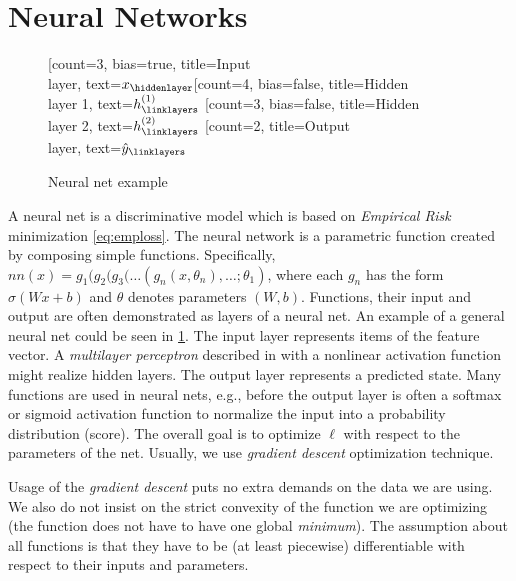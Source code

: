 \section{Neural Networks}
\begin{figure}
    \centering
    \begin{neuralnetwork}[height=4]
        \newcommand{\x}[2]{$x_#2$}
        \newcommand{\y}[2]{$\hat{y}_#2$}
        \newcommand{\hfirst}[2]{\small $h^{(1)}_#2$}
        \newcommand{\hsecond}[2]{\small $h^{(2)}_#2$}
        [count=3, bias=true, title=Input\\layer, text=\x]
        \hiddenlayer[count=4, bias=false, title=Hidden\\layer 1, text=\hfirst] \linklayers
        \hiddenlayer[count=3, bias=false, title=Hidden\\layer 2, text=\hsecond] \linklayers
        \outputlayer[count=2, title=Output\\layer, text=\y] \linklayers
    \end{neuralnetwork}
    \caption{Neural net example}
    \label{fig:neuralnet}
\end{figure}

A neural net is a discriminative model which is based on \emph{Empirical Risk} minimization \eqref{eq:emploss}. The neural network is a parametric function created by composing simple functions. Specifically, $nn(x) = g_1(g_2(g_3(\dots(g_n(x,\theta_n),\dots;\theta_1)$, where each $g_n$ has the form $\sigma(Wx + b)$ and $\theta$ denotes parameters $(W,b)$. Functions, their input and output are often demonstrated as layers of a neural net. An example of a general neural net could be seen in \ref{fig:neuralnet}. The input layer represents items of the feature vector. A \emph{multilayer perceptron} described in \cite{Russell2009} with a nonlinear activation function might realize hidden layers. The output layer represents a predicted state. Many functions are used in neural nets, e.g., before the output layer is often a softmax or sigmoid activation function to normalize the input into a probability distribution (score). The overall goal is to optimize $\ell$ with respect to the parameters of the net. Usually, we use \emph{gradient descent} optimization technique.

Usage of the \emph{gradient descent} puts no extra demands on the data we are using. We also do not insist on the strict convexity of the function we are optimizing (the function does not have to have one global \emph{minimum}). The assumption about all functions is that they have to be (at least piecewise) differentiable with respect to their inputs and parameters. 

